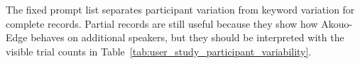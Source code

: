 The fixed prompt list separates participant variation from keyword variation for complete records. Partial records are still useful because they show how Akouo-Edge behaves on additional speakers, but they should be interpreted with the visible trial counts in Table~\ref{tab:user_study_participant_variability}.
